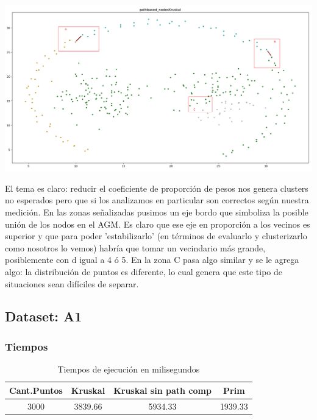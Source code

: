 \documentclass[11pt,a4paper]{article}
\begin{document}
\begin{center}
\includegraphics[scale=.41]{graficos/pathbased_nodosKruskal2.png}
\end{center}
El tema es claro: reducir el coeficiente de proporción de pesos nos genera clusters no esperados pero que si los analizamos en particular son correctos según nuestra medición. En las zonas señalizadas pusimos un eje bordo que simboliza la posible unión de los nodos en el AGM. Es claro que ese eje en proporción a los vecinos es superior y que para poder 'estabilizarlo' (en términos de evaluarlo y clusterizarlo como nosotros lo vemos) habría que tomar un vecindario más grande, posiblemente con d igual a 4 ó 5. En la zona C pasa algo similar y se le agrega algo: la distribución de puntos es diferente, lo cual genera que este tipo de situaciones sean difíciles de separar.


\subsection{Dataset: A1}
\subsubsection{Tiempos}
\begin{table}[ht]
\caption{Tiempos de ejecución en milisegundos} %
\centering %
\begin{tabular}{c c c c} %
\hline\hline %
Cant.Puntos & Kruskal & Kruskal sin path comp & Prim \\ [0.5ex] %
\hline %
3000 & 3839.66 & 5934.33 & 1939.33 \\ [1ex] %
\hline %
\end{tabular}
\label{table:nonlin} %
\end{table} 
\end{document}
